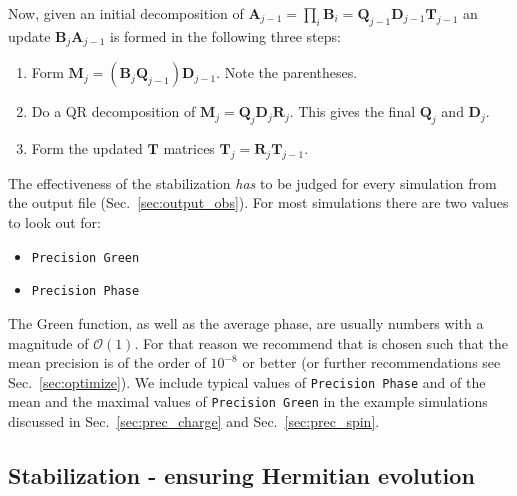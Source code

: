 Now, given an initial decomposition of $\bm{A}_{j-1} = \prod_i \mathcal{\bm{B}}_i = \bm{Q}_{j-1} \bm{D}_{j-1} \bm{T}_{j-1}$ an update
$\mathcal{\bm{B}}_j \bm{A}_{j-1}$ is formed in the following three steps:
\begin{enumerate}
\item Form $ \bm{M}_j = (\mathcal{\bm{B}}_j \bm{Q}_{j-1}) \bm{D}_{j-1}$. Note the parentheses.
\item Do a QR decomposition of $\bm{M}_j = \bm{Q}_j \bm{D}_j \bm{R}_j$. This gives the final $\bm{Q}_j$ and $\bm{D}_j$.
\item Form the updated $\bm{T}$ matrices $\bm{T}_j = \bm{R}_j \bm{T}_{j-1}$.
\end{enumerate}
The effectiveness of the stabilization \emph{has} to be judged for every simulation from the output file  (Sec.~\ref{sec:output_obs}). For most simulations there are two values to look out for:
\begin{itemize}
\item \texttt{Precision Green}
\item \texttt{Precision Phase}
\end{itemize}
The Green function, as well as the average phase, are usually numbers with a magnitude of $\mathcal{O} (1)$. 
For that reason we recommend that  is chosen such that the mean precision is of the order of $10^{-8}$ or better (or further recommendations see Sec.~\ref{sec:optimize}).
We include typical values of \texttt{Precision Phase} and of the mean and the maximal values of \texttt{Precision Green} in the example simulations discussed in Sec.~\ref{sec:prec_charge} and Sec.~\ref{sec:prec_spin}.


\subsection{Stabilization - ensuring Hermitian evolution}\label{sec:hermitian}
%

